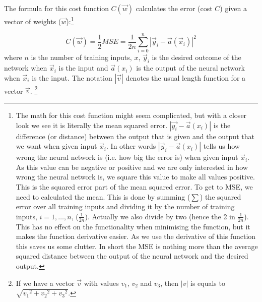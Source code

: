 The formula for this cost function $C(\vec{w})$ calculates the error (cost $C$) given a vector of weights ($\vec{w}$):\footnote{The math for this cost function might seem complicated, but with a closer look we see it is literally the mean squared error. $\left | \vec{y_i} - \vec{a}(x_i) \right |$ is the difference (or distance) between the output that is given and the output that we want when given input $\vec{x}_i$. In other words $\left | \vec{y}_i - \vec{a}(x_i) \right | $ tells us how wrong the neural network is (i.e. how big the error is) when given input $\vec{x}_i$. As this value can be negative or positive and we are only interested in how wrong the neural network is, we square this value to make all values positive. This is the squared error part of the mean squared error. To get to MSE, we need to calculated the mean. This is done by summing ($\sum$) the squared error over all training inputs and dividing it by the number of training inputs, $i=1,\ldots,n$, ($\frac{1}{2n}$). Actually we also divide by two (hence the 2 in $\frac{1}{2n}$). This has no effect on the functionality when minimising the function, but it makes the function derivative easier. As we use the derivative of this function this  saves us some clutter. In short the MSE is nothing more than the average squared distance between the output of the neural network and the desired output.}


\begin{equation}
C(\vec{w}) = \frac{1}{2} MSE = \frac{1}{2n} \sum_{i=0}^n \left | \vec{y}_i - \vec{a}(\vec{x}_i) \right |^2
\label{eq:MSE}
\end{equation}
where $n$ is the number of training inputs, $x$, $\vec{y}_i$ is the desired outcome of the network when $\vec{x}_i$ is the input and $\vec{a}(x_i)$ is the output of the neural network when $\vec{x}_i$ is the input. The notation $\left | \vec{v} \right |$ denotes the usual length function for a vector $\vec{v}$. \footnote{If we have a vector $\vec{v}$ with values $v_1$, $v_2$ and $v_3$, then $\left | v \right |$ is equals to $ \sqrt{{v_1}^2+{v_2}^2+{v_3}^2}$.}

